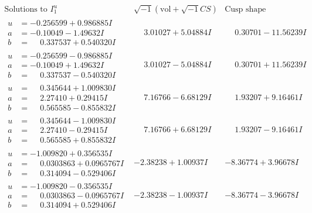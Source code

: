 \documentclass[1p]{elsarticle_modified}
\theoremstyle{definition}
\newcommand{\I}{\sqrt{-1}}
\begin{document}
$$\begin{array}{c|c|c}  
\text{Solutions to }I^u_{1}& \I (\text{vol} + \sqrt{-1}CS) & \text{Cusp shape}\\
 \hline 
\begin{aligned}
u &= -0.256599 + 0.986885 I \\
a &= -0.10049 - 1.49632 I \\
b &= \phantom{-}0.337537 + 0.540320 I\end{aligned}
 & \phantom{-}3.01027 + 5.04884 I & \phantom{-}0.30701 - 11.56239 I \\ \hline\begin{aligned}
u &= -0.256599 - 0.986885 I \\
a &= -0.10049 + 1.49632 I \\
b &= \phantom{-}0.337537 - 0.540320 I\end{aligned}
 & \phantom{-}3.01027 - 5.04884 I & \phantom{-}0.30701 + 11.56239 I \\ \hline\begin{aligned}
u &= \phantom{-}0.345644 + 1.009830 I \\
a &= \phantom{-}2.27410 + 0.29415 I \\
b &= \phantom{-}0.565585 - 0.855832 I\end{aligned}
 & \phantom{-}7.16766 - 6.68129 I & \phantom{-}1.93207 + 9.16461 I \\ \hline\begin{aligned}
u &= \phantom{-}0.345644 - 1.009830 I \\
a &= \phantom{-}2.27410 - 0.29415 I \\
b &= \phantom{-}0.565585 + 0.855832 I\end{aligned}
 & \phantom{-}7.16766 + 6.68129 I & \phantom{-}1.93207 - 9.16461 I \\ \hline\begin{aligned}
u &= -1.009820 + 0.356535 I \\
a &= \phantom{-}0.0303863 + 0.0965767 I \\
b &= \phantom{-}0.314094 - 0.529406 I\end{aligned}
 & -2.38238 + 1.00937 I & -8.36774 + 3.96678 I \\ \hline\begin{aligned}
u &= -1.009820 - 0.356535 I \\
a &= \phantom{-}0.0303863 - 0.0965767 I \\
b &= \phantom{-}0.314094 + 0.529406 I\end{aligned}
 & -2.38238 - 1.00937 I & -8.36774 - 3.96678 I \\ \hline\begin{aligned}

\end{aligned}
\end{array}$$
\end{document}
